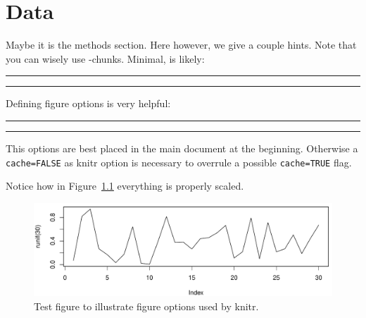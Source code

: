 

\chapter{Data} 
Maybe it is the methods section. Here however, we give a couple hints.
Note that you can wisely use -chunks. Minimal, is likely: 

\bigskip

% 



\hrule

\hrule

\bigskip

Defining figure options is very helpful:

 
\bigskip


\hrule

\hrule

\bigskip 

This options are best placed in the main document at the beginning. Otherwise a \verb+cache=FALSE+ as knitr option is necessary to overrule a possible  \verb+cache=TRUE+ flag. 

\bigskip 

Notice how in Figure~\ref{f02:1} everything is properly scaled.   

\begin{figure}
\begin{knitrout}
\color{fgcolor}

{\centering \includegraphics[width=\textwidth-3cm]{figure/ch02_figunnamed-chunk-3-1} 

}


\end{knitrout}
  \caption{Test figure to illustrate figure options used by knitr.}
  \label{f02:1}
\end{figure}


